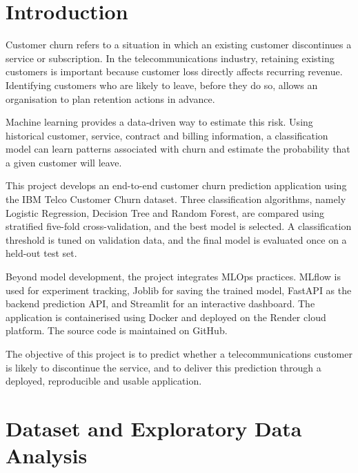\documentclass[12pt,a4paper]{report}
\begin{document}
\thispagestyle{empty}
\newpage
    
\tableofcontents
\listoffigures

\cleardoublepage
\setcounter{page}{1}

\chapter{Introduction}

Customer churn refers to a situation in which an existing customer discontinues a service or subscription. In the telecommunications industry, retaining existing customers is important because customer loss directly affects recurring revenue. Identifying customers who are likely to leave, before they do so, allows an organisation to plan retention actions in advance.

Machine learning provides a data-driven way to estimate this risk. Using historical customer, service, contract and billing information, a classification model can learn patterns associated with churn and estimate the probability that a given customer will leave.

This project develops an end-to-end customer churn prediction application using the IBM Telco Customer Churn dataset. Three classification algorithms, namely Logistic Regression, Decision Tree and Random Forest, are compared using stratified five-fold cross-validation, and the best model is selected. A classification threshold is tuned on validation data, and the final model is evaluated once on a held-out test set.

Beyond model development, the project integrates MLOps practices. MLflow is used for experiment tracking, Joblib for saving the trained model, FastAPI as the backend prediction API, and Streamlit for an interactive dashboard. The application is containerised using Docker and deployed on the Render cloud platform. The source code is maintained on GitHub.

The objective of this project is to predict whether a telecommunications customer is likely to discontinue the service, and to deliver this prediction through a deployed, reproducible and usable application.

\chapter{Dataset and Exploratory Data Analysis}
\end{document}
